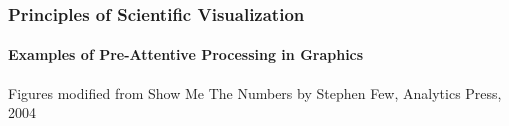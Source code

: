 \documentclass[10pt]{beamer}
\begin{document}
\begin{frame}
\frametitle{Principles of Scientific Visualization}
\framesubtitle{Examples of Pre-Attentive Processing in Graphics}

\begin{center}
\end{center}
{\tiny Figures modified from {\color{blue} Show Me The Numbers} by Stephen Few, Analytics Press, 2004\\ }
\end{frame}
\end{document}
